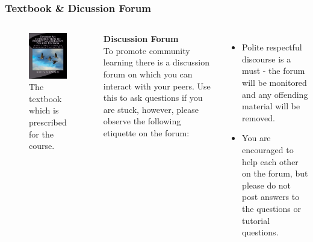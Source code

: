 \documentclass[aspectratio=169]{beamer}
\begin{document}
\begin{frame}
\frametitle{Textbook \& Dicussion Forum}

\begin{columns}
\begin{figure}
\includegraphics[scale=0.3]{textbook}
\caption{The textbook which is prescribed for the course.}
\end{figure}
\textbf{Discussion Forum}\\
\vspace{0.5cm} \small
To promote community learning there is a discussion forum on which you can interact with your peers. Use this to ask questions if you are stuck, however, please observe the following etiquette on the forum:
\begin{itemize}
\item Polite respectful discourse is a must - the forum will be monitored and any offending material will be removed.
\item You are encouraged to help each other on the forum, but please do not post answers to the questions or tutorial questions. 
\end{itemize}
\end{columns}

\end{frame}
\end{document}
